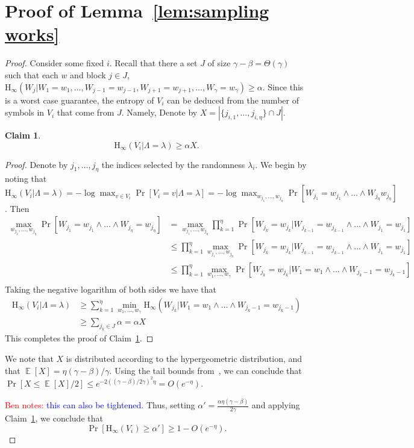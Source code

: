 \documentclass[11pt]{article}
\newcommand{\lemref}[1]{\mbox{Lemma~\ref{#1}}}
\newcommand{\clref}[1]{\mbox{Claim~\ref{#1}}}
\DeclareMathOperator*{\expe}{\mathbb{E}}
\newcommand{\Hoo}{\mathrm{H}_\infty}
\newtheorem{claim}[theorem]{Claim}
\newcommand{\authnote}[2]{{\textcolor{red}{\textsf{#1 notes: }\textcolor{blue}{ #2}}\marginpar{\textcolor{red}{\textbf{!!!!!}}}}}
\newcommand{\authnote}[2]{}
\newcommand{\bnote}[1]{{\authnote{Ben}{#1}}}
\begin{document}
\section{Proof of \lemref{lem:sampling works}}
\label{sec:proof of sampling lemma}
\begin{proof}
Consider some fixed $i$.
Recall that there a set $J$  of size $\gamma - \beta = \Theta(\gamma)$ such that each $w$ and  block $j\in J$, $\Hoo(W_j | W_1 = w_1,..., W_{j-1}=w_{j-1}, W_{j+1}=w_{j+1},..., W_\gamma = w_\gamma) \geq \alpha$.  Since this is a worst case guarantee, the entropy of $V_i$ can be deduced from the number of symbols in $V_i$ that come from $J$. Namely, Denote by $X= |\{j_{i, 1},..., j_{i, \eta}\}\cap J|$.

\begin{claim}
\label{cl:vi have entropy}
\[
\Hoo(V_i |\Lambda = \lambda ) \geq \alpha X.
\]
\end{claim}
\begin{proof}
Denote by $j_1,..., j_\eta$ the indices selected by the randomness $\lambda_i$.  We begin by noting that $\Hoo(V_i |\Lambda = \lambda ) = -\log \max_{v\in V_i} \Pr[ V_i =v | \Lambda =\lambda] = -\log \max_{w_{j_1}, ..., w_{j_\eta}} \Pr[W_{j_1} = w_{j_1} \wedge \dots \wedge W_{j_\eta} w_{j_\eta}] $.  Then
\begin{align*}
\max_{w_{j_1},..., w_{j_\eta}} \Pr[ W_{j_1}=w_{j_1} \wedge \dots \wedge W_{j_\eta} = w_{j_\eta}]
&= \max_{w_{j_1},..., w_{j_\eta}} \prod_{k=1}^\eta \Pr[W_{j_k} = w_{j_k} | W_{j_{k-1}} = w_{j_{k-1}} \wedge ... \wedge W_{j_1} = w_{j_1}]\\
&\le \prod_{k=1}^\eta \max_{w_{j_1},..., w_{j_\eta}} \Pr[W_{j_k} = w_{j_k} | W_{j_{k-1}} = w_{j_{k-1}} \wedge ... \wedge W_{j_1} = w_{j_1}]\\
&\le\prod_{k=1}^\eta \max_{w_1,..., w_\gamma} \Pr[W_{j_k} = w_{j_k} | W_1 = w_1 \wedge ... \wedge W_{{j_k}-1} = w_{{j_k}-1} ]\\
\end{align*}
Taking the negative logarithm of both sides we have that
\begin{align*}
\Hoo(V_i | \Lambda = \lambda) &\ge \sum_{k=1}^\eta \min_{w_1,..., w_\gamma} \Hoo(W_{j_k} | W_1 = w_1 \wedge ... \wedge W_{{j_k}-1} = w_{{j_k}-1})\\
&\ge \sum_{j_k\in J} \alpha = \alpha X
\end{align*}
This completes the proof of \clref{cl:vi have entropy}.
\end{proof}


We note that $X$ is distributed according to the hypergeometric distribution,
and that $\expe[X]=\eta(\gamma-\beta)/\gamma$. Using the tail bounds from~\cite{chvatal1979tail,scala2009hypergeometric}, we can conclude that $\Pr[X\le \expe[X]/2]\le e^{-2((\gamma-\beta)/2\gamma)^2 \eta}=O(e^{-\eta})$.

\bnote{this can also be tightened.}
Thus, setting $\alpha'=\frac{\alpha \eta(\gamma-\beta)}{2\gamma}$ and applying \clref{cl:vi have entropy}, we conclude that
 \[
\Pr[\Hoo(V_i ) \geq \alpha'] \geq 1- O(e^{-\eta}).
\]
\end{proof}
\end{document}
